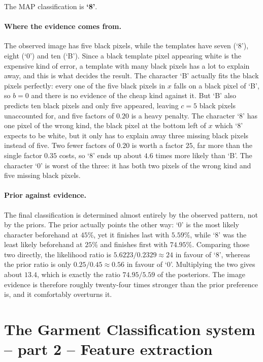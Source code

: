 \documentclass[11pt]{article}
\begin{document}
The MAP classification is \textbf{`8'}.

\paragraph{Where the evidence comes from.}
The observed image has five black pixels, while the templates have seven
(`8'), eight (`0') and ten (`B'). Since a black template pixel appearing white
is the expensive kind of error, a template with many black pixels has a lot to
explain away, and this is what decides the result. The character `B' actually
fits the black pixels perfectly: every one of the five black pixels in $x$
falls on a black pixel of `B', so $b=0$ and there is no evidence of the
cheap kind against it. But `B' also predicts ten black pixels and only five
appeared, leaving $c=5$ black pixels unaccounted for, and five factors of
$0.20$ is a heavy penalty. The character `8' has one pixel of the wrong kind,
the black pixel at the bottom left of $x$ which `8' expects to be white, but
it only has to explain away three missing black pixels instead of five. Two
fewer factors of $0.20$ is worth a factor $25$, far more than the single
factor $0.35$ costs, so `8' ends up about $4.6$ times more likely than `B'.
The character `0' is worst of the three: it has both two pixels of the wrong
kind and five missing black pixels.

\paragraph{Prior against evidence.}
The final classification is determined almost entirely by the observed
pattern, not by the priors. The prior actually points the other way: `0' is
the most likely character beforehand at $45\%$, yet it finishes last with
$5.59\%$, while `8' was the least likely beforehand at $25\%$ and finishes
first with $74.95\%$. Comparing those two directly, the likelihood ratio is
$5.6223/0.2329 \approx 24$ in favour of `8', whereas the prior ratio is only
$0.25/0.45 \approx 0.56$ in favour of `0'. Multiplying the two gives about
$13.4$, which is exactly the ratio $74.95/5.59$ of the posteriors. The image
evidence is therefore roughly twenty-four times stronger than the prior
preference is, and it comfortably overturns it.



\section{The Garment Classification system -- part 2 -- Feature extraction}
\end{document}
